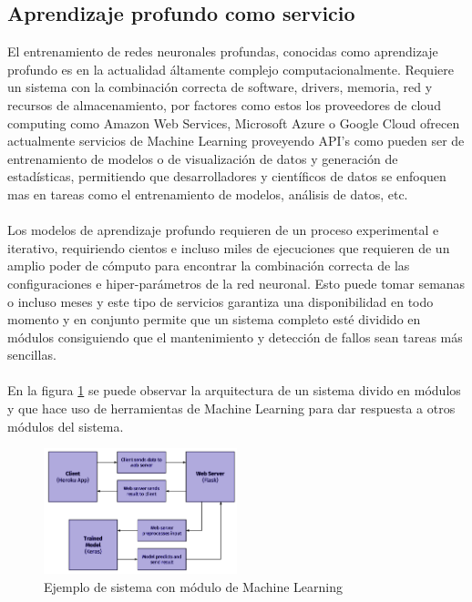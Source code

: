 \subsection{Aprendizaje profundo como servicio}
El entrenamiento de redes neuronales profundas, conocidas como aprendizaje profundo es en la actualidad áltamente complejo computacionalmente. Requiere un sistema con la combinación correcta de software, drivers, memoria, red y recursos de almacenamiento, por factores como estos los proveedores de cloud computing como Amazon Web Services, Microsoft Azure o Google Cloud ofrecen actualmente servicios de Machine Learning proveyendo API's como pueden ser de entrenamiento de modelos o de visualización de datos y generación de estadísticas, permitiendo que desarrolladores y científicos de datos se enfoquen mas en tareas como el entrenamiento de modelos, análisis de datos, etc.
\\\\
Los modelos de aprendizaje profundo requieren de un proceso experimental e iterativo, requiriendo cientos e incluso miles de ejecuciones que requieren de un amplio poder de cómputo para encontrar la combinación correcta de las configuraciones e hiper-parámetros de la red neuronal. Esto puede tomar semanas o incluso meses y este tipo de servicios garantiza una disponibilidad en todo momento y en conjunto permite que un sistema completo esté dividido en módulos consiguiendo que el mantenimiento y detección de fallos sean tareas más sencillas.
\\\\ 
En la figura \ref{fig:DLAAS} se puede observar la arquitectura de un sistema divido en módulos y que hace uso de herramientas de Machine Learning para dar respuesta a otros módulos del sistema.

\begin{figure}[H]
	\centering
	\includegraphics[width=0.5\textwidth]{capitulo2/images/DLAAS.png}
	\caption{Ejemplo de sistema con módulo de Machine Learning}
	\label{fig:DLAAS}
\end{figure}

